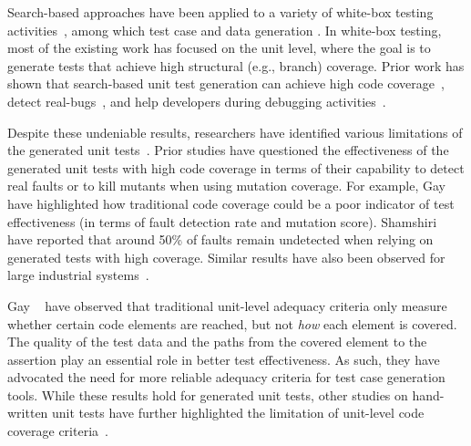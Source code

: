 


Search-based approaches have been applied to a variety of white-box testing activities~\cite{Harman2012}, among which test case and data generation \cite{McMinn2004}. 
In white-box testing, most of the existing work has focused on the unit level, where the goal is to generate tests that achieve high structural (e.g., branch) coverage.
Prior work has shown that search-based unit test generation can achieve high code coverage~\cite{almasi2017industrial, Campos2017, Panichella2018a}, detect real-bugs~\cite{fraser20151600, Shamshiri2016}, and help developers during debugging activities~\cite{Ceccato2015, Panichella2016}.
 
Despite these undeniable results, researchers have identified various limitations of the generated unit tests~\cite{gay2015risks, Shamshiri2016, schwartz2018}. 
Prior studies have questioned the effectiveness of the generated unit tests with high code coverage in terms of their capability to detect real faults or to kill mutants when using mutation coverage. 
For example, Gay \etal~\cite{gay2015risks} have highlighted how traditional code coverage could be a poor indicator of test effectiveness (in terms of fault detection rate
 and mutation score). Shamshiri \etal~\cite{Shamshiri2016} have reported that around 50\% of faults remain undetected when relying on generated tests with high coverage. 
 Similar results have also been observed for large industrial systems~\cite{almasi2017industrial}. 

Gay \etal~\cite{gay2015risks} have observed that traditional unit-level adequacy criteria only measure whether certain code elements are reached, but not \textit{how} each element is 
covered. The quality of the test data and the paths from the covered element to the assertion play an essential role in better test effectiveness. As such, they have advocated the need 
for more reliable adequacy criteria for test case generation tools. While these results hold for generated unit tests, other studies on hand-written unit tests have further highlighted 
the limitation of unit-level code coverage criteria~\cite{wei2012branch, schwartz2018}.



